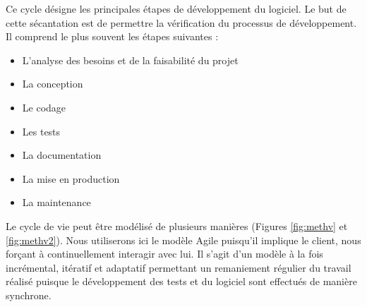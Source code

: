 Ce cycle désigne les principales étapes de développement du logiciel.
Le but de cette sécantation est de permettre la vérification du processus de développement.
Il comprend le plus souvent les étapes suivantes :
\begin{itemize}
        \item L'analyse des besoins et de la faisabilité du projet
        \item La conception
        \item Le codage
        \item Les tests
        \item La documentation
        \item La mise en production
        \item La maintenance
\end{itemize}
Le cycle de vie peut être modélisé de plusieurs manières (Figures \ref{fig:methv}  et \ref{fig:methv2}).
Nous utiliserons ici le modèle Agile puisqu'il implique le client, nous forçant à continuellement 
interagir avec lui. Il s'agit d'un modèle à la fois incrémental, itératif et adaptatif 
permettant un remaniement régulier du travail réalisé puisque le développement des tests et du logiciel 
sont effectués de manière synchrone.

